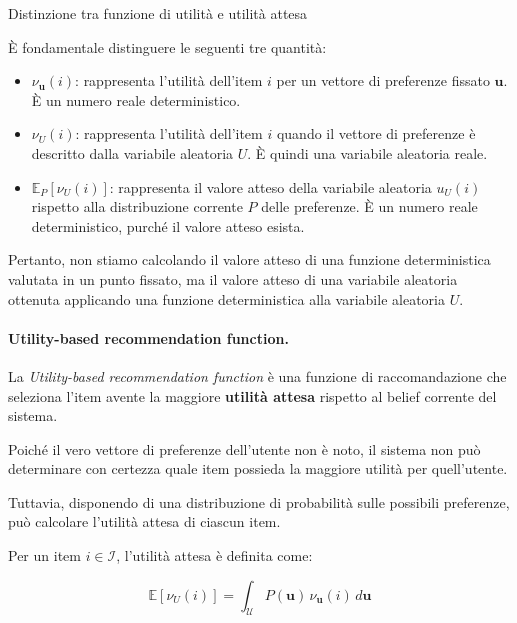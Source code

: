 \begin{observation}{Distinzione tra funzione di utilità e utilità attesa}

È fondamentale distinguere le seguenti tre quantità:

\begin{itemize}
    \item $\nu_{\mathbf u}(i)$: rappresenta l'utilità dell'item $i$
    per un vettore di preferenze fissato $\mathbf u$.
    È un numero reale deterministico.

    \item $\nu_U(i)$: rappresenta l'utilità dell'item $i$
    quando il vettore di preferenze è descritto dalla variabile
    aleatoria $U$. È quindi una variabile aleatoria reale.

    \item $\mathbb E_P[\nu_U(i)]$: rappresenta il valore atteso
    della variabile aleatoria $u_U(i)$ rispetto alla distribuzione
    corrente $P$ delle preferenze. È un numero reale deterministico,
    purché il valore atteso esista.
\end{itemize}

Pertanto, non stiamo calcolando il valore atteso di una funzione
deterministica valutata in un punto fissato, ma il valore atteso
di una variabile aleatoria ottenuta applicando una funzione
deterministica alla variabile aleatoria $U$.

\end{observation}

\paragraph{Utility-based recommendation function.}

La \textit{Utility-based recommendation function} è una funzione
di raccomandazione che seleziona l'item avente la maggiore
\textbf{utilità attesa} rispetto al belief corrente del sistema.

Poiché il vero vettore di preferenze dell'utente non è noto,
il sistema non può determinare con certezza quale item possieda
la maggiore utilità per quell'utente.

Tuttavia, disponendo di una distribuzione di probabilità
sulle possibili preferenze, può calcolare l'utilità attesa
di ciascun item.

Per un item $i\in\mathcal I$, l'utilità attesa è definita come:

\[
\boxed{
\mathbb E[\nu_U(i)]
=
\int_{\mathcal U}
P(\mathbf u)\,\nu_{\mathbf u}(i)\,d\mathbf u
}
\]

